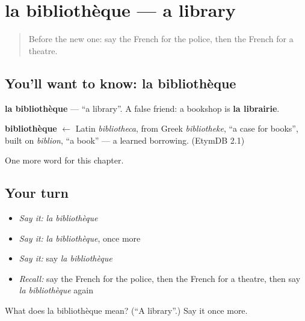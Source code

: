 \section[la bibliothèque]{la bibliothèque — a library}

\label{lesson:FR-C102-bibliotheque}



\begin{quote}
Before the new one: say the French for the police, then the French for a theatre.
\end{quote}

\subsection*{You'll want to know: la bibliothèque}
\textbf{la bibliothèque} — \textquotedblleft{}a library\textquotedblright{}. A false friend: a bookshop is \textbf{la librairie}.

\begin{cousinweb}
\textbf{bibliothèque} $\leftarrow$ Latin \emph{bibliotheca}, from Greek \emph{bibliotheke}, \textquotedblleft{}a case for books\textquotedblright{}, built on \emph{biblion}, \textquotedblleft{}a book\textquotedblright{} — a learned borrowing. (EtymDB 2.1)
\end{cousinweb}

\begin{grammarlens}[title={What you've built}]
One more word for this chapter.
\end{grammarlens}

\subsection*{Your turn}
\begin{itemize}
\raggedright
  \item \emph{Say it:} \emph{la bibliothèque}
  \item \emph{Say it:} \emph{la bibliothèque}, once more
  \item \emph{Say it:} say \emph{la bibliothèque}
  \item \emph{Recall:} say the French for the police, then the French for a theatre, then say \emph{la bibliothèque} again
\end{itemize}

\begin{tcolorbox}[breakable,colback=teal!4,colframe=teal!35!black,title={Before you move on}]
What does la bibliothèque mean? (\textquotedblleft{}A library\textquotedblright{}.) Say it once more.
\end{tcolorbox}
